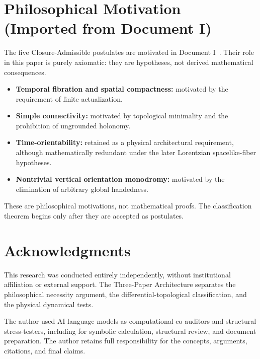 \documentclass[11pt]{article}
\theoremstyle{canonmath}
\theoremstyle{canonpostulate}
\theoremstyle{canonproposition}
\begin{document}
\section{Philosophical Motivation (Imported from Document I)}

The five Closure-Admissible postulates are motivated in Document I~\cite{CanonWhy}. Their role in this paper is purely axiomatic: they are hypotheses, not derived mathematical consequences.

\begin{itemize}
    \item \textbf{Temporal fibration and spatial compactness:} motivated by the requirement of finite actualization.
    \item \textbf{Simple connectivity:} motivated by topological minimality and the prohibition of ungrounded holonomy.
    \item \textbf{Time-orientability:} retained as a physical architectural requirement, although mathematically redundant under the later Lorentzian spacelike-fiber hypotheses.
    \item \textbf{Nontrivial vertical orientation monodromy:} motivated by the elimination of arbitrary global handedness.
\end{itemize}

These are philosophical motivations, not mathematical proofs. The classification theorem begins only after they are accepted as postulates.

\newpage
\section*{Acknowledgments}

This research was conducted entirely independently, without institutional affiliation or external support. The Three-Paper Architecture separates the philosophical necessity argument, the differential-topological classification, and the physical dynamical tests.

The author used AI language models as computational co-auditors and structural stress-testers, including for symbolic calculation, structural review, and document preparation. The author retains full responsibility for the concepts, arguments, citations, and final claims.
\end{document}
